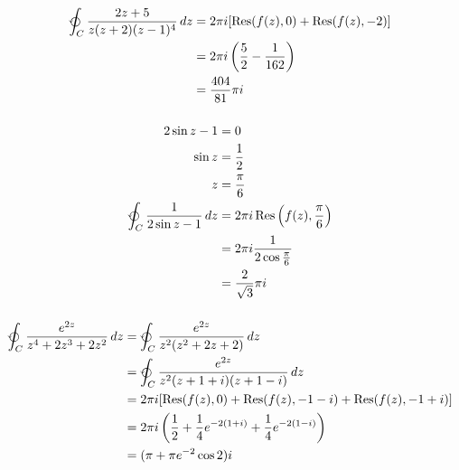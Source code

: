 \documentclass{article}
\newcommand{\Res}{\operatorname{Res}}
\begin{document}
\begin{align*}
  \varointctrclockwise_C \frac{2 z + 5}{z (z + 2) (z - 1)^4} \,d z & = 2 \pi i [\Res(f(z), 0) + \Res(f(z), -2)]           \\
                                                                   & = 2 \pi i \left( \frac{5}{2} - \frac{1}{162} \right) \\
                                                                   & = \frac{404}{81} \pi i
\end{align*}

\setcounter{subsubsection}{22}
\subsubsection{}

\begin{align*}
  2 \sin z - 1                                        & = 0                                               \\
  \sin z                                              & = \frac{1}{2}                                     \\
  z                                                   & = \frac{\pi}{6}                                   \\
  \varointctrclockwise_C \frac{1}{2 \sin z - 1} \,d z & = 2 \pi i \Res \left( f(z), \frac{\pi}{6} \right) \\
                                                      & = 2 \pi i \frac{1}{2 \cos \frac{\pi}{6}}          \\
                                                      & = \frac{2}{\sqrt{3}} \pi i
\end{align*}

\setcounter{subsubsection}{24}
\subsubsection{}

\begin{align*}
  \varointctrclockwise_C \frac{e^{2 z}}{z^4 + 2 z^3 + 2 z^2} \,d z & = \varointctrclockwise_C \frac{e^{2 z}}{z^2 (z^2 + 2 z + 2)} \,d z                             \\
                                                                   & = \varointctrclockwise_C \frac{e^{2 z}}{z^2 (z + 1 + i) (z + 1 - i)} \,d z                     \\
                                                                   & = 2 \pi i [\Res(f(z), 0) + \Res(f(z), -1 - i) + \Res(f(z), -1 + i)]                            \\
                                                                   & = 2 \pi i \left( \frac{1}{2} + \frac{1}{4} e^{-2 (1 + i)} + \frac{1}{4} e^{-2 (1 - i)} \right) \\
                                                                   & = (\pi + \pi e^{-2} \cos 2) i
\end{align*}
\end{document}

